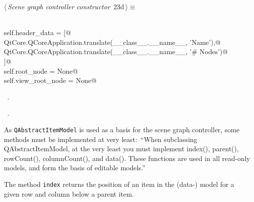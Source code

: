 \documentclass[
    a4paper,      %
    10pt,         %
    openright,    %
    notitlepage,  %
    parskip=half, %
]{scrreprt}       %
\theoremstyle{definition}                    %
\begin{document}
\begin{flushleft} \small
\begin{minipage}{\linewidth}\label{scrap21}\raggedright\small
{} $\langle\,${\itshape Scene graph controller constructor}\nobreak\ {\footnotesize {23d}}$\,\rangle\equiv$
\vspace{-1exm}
\begin{list}{}{} \item
\mbox{}\lstinline@@\\
\mbox{}\lstinline@    self.header_data = [@\\
\mbox{}\lstinline@        QtCore.QCoreApplication.translate(__class__.__name__, 'Name'),@\\
\mbox{}\lstinline@        QtCore.QCoreApplication.translate(__class__.__name__, '# Nodes')@\\
\mbox{}\lstinline@    ]@\\
\mbox{}\lstinline@    self.root_node = None@\\
\mbox{}\lstinline@    self.view_root_node = None@\\
\mbox{}\lstinline@@{\NWsep}
\end{list}
\vspace{-1.5ex}
\footnotesize
\begin{list}{}{\setlength{\itemsep}{-\parsep}\setlength{\itemindent}{-\leftmargin}}
\item \NWtxtMacroDefBy\ .
\item \NWtxtMacroRefIn\ .

\item{}
\end{list}
\end{minipage}\vspace{4ex}
\end{flushleft}

As \verb+QAbstractItemModel+ is used as a basis for the scene graph controller,
some methods must be implemented at very least:~\enquote{When subclassing
QAbstractItemModel, at the very least you must implement index(), parent(),
rowCount(), columnCount(), and data(). These functions are used in all read-only
models, and form the basis of editable
models.}

The method \verb+index+ returns the position of an item in the (data-) model for
a given row and column below a parent item.
\end{document}
